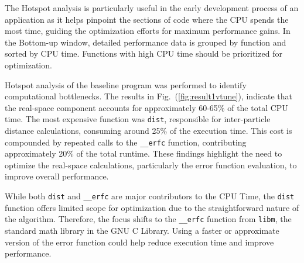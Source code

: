 The Hotspot analysis is particularly useful in the early development process of an application as it helps pinpoint the sections of code where the CPU spends the most time, guiding the optimization efforts for maximum performance gains. In the Bottom-up window, detailed performance data is grouped by function and sorted by CPU time. Functions with high CPU time should be prioritized for optimization.



Hotspot analysis of the baseline program was performed to identify computational bottlenecks. The results in Fig.~(\ref{fig:result1vtune}), indicate that the real-space component accounts for approximately 60-65\% of the total CPU time. The most expensive function was \texttt{dist}, responsible for inter-particle distance calculations, consuming around 25\% of the execution time. This cost is compounded by repeated calls to the \texttt{\_\_erfc} function, contributing approximately 20\% of the total runtime. These findings highlight the need to optimize the real-space calculations, particularly the error function evaluation, to improve overall performance.

While both \texttt{dist} and \texttt{\_\_erfc} are major contributors to the CPU Time, the \texttt{dist} function offers limited scope for optimization due to the straightforward nature of the algorithm. Therefore, the focus shifts to the \texttt{\_\_erfc} function from \texttt{libm}, the standard math library in the GNU C Library. Using a faster or approximate version of the error function could help reduce execution time and improve performance.


